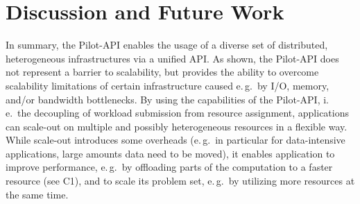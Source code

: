 \documentclass[conference]{IEEEtran}
\begin{document}


% 
% 



\section{Discussion and Future Work}
\label{sec:discussion-future-work}

In summary, the Pilot-API enables the usage of a diverse set of
distributed, heterogeneous infrastructures via a unified API. As
shown, the Pilot-API does not represent a barrier to scalability, but
provides the ability to overcome scalability limitations of certain
infrastructure caused e.\,g.\ by I/O, memory, and/or bandwidth
bottlenecks. By using the capabilities of the Pilot-API, i.\,e.\ the
decoupling of workload submission from resource assignment,
applications can scale-out on multiple and possibly heterogeneous
resources in a flexible way. While scale-out introduces some overheads
(e.\,g.\ in particular for data-intensive applications, large amounts
data need to be moved), it enables application to improve performance,
e.\,g.\ by offloading parts of the computation to a faster resource
(see C1), and to scale its problem set, e.\,g.\ by utilizing more
resources at the same time.

\end{document}
